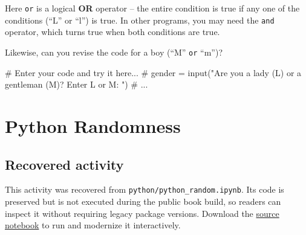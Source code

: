 \documentclass[
  letterpaper,
]{scrbook}
\newenvironment{Shaded}{\begin{snugshade}}{\end{snugshade}}
\newcommand{\CommentTok}[1]{\textcolor[rgb]{0.37,0.37,0.37}{#1}}
\begin{document}
Here \texttt{or} is a logical \textbf{OR} operator -- the entire
condition is true if any one of the conditions (``L'' or ``l'') is true.
In other programs, you may need the \texttt{and} operator, which turns
true when both conditions are true.

Likewise, can you revise the code for a boy (``M'' \texttt{or} ``m'')?

\begin{Shaded}
\begin{Highlighting}[]
\CommentTok{\# Enter your code and try it here...}
\CommentTok{\# gender = input("Are you a lady (L) or a gentleman (M)? Enter L or M: ")}
\CommentTok{\# ...}
\end{Highlighting}
\end{Shaded}

\chapter*{Python Randomness}\label{ch-lab-python-random}


\section*{Recovered activity}\label{sec-lab-python-random}


\begin{tcolorbox}[enhanced jigsaw, arc=.35mm, bottomrule=.15mm, bottomtitle=1mm, breakable, colback=white, colbacktitle=quarto-callout-note-color!10!white, colframe=quarto-callout-note-color-frame, coltitle=black, left=2mm, leftrule=.75mm, opacityback=0, opacitybacktitle=0.6, rightrule=.15mm, title=\textcolor{quarto-callout-note-color}{\faInfo}\hspace{0.5em}{Historical source and execution note}, titlerule=0mm, toprule=.15mm, toptitle=1mm]

This activity was recovered from \texttt{python/python\_random.ipynb}.
Its code is preserved but is not executed during the public book build,
so readers can inspect it without requiring legacy package versions.
Download the \href{../notebooks/python-random.ipynb}{source notebook} to
run and modernize it interactively.

\end{tcolorbox}
\end{document}
